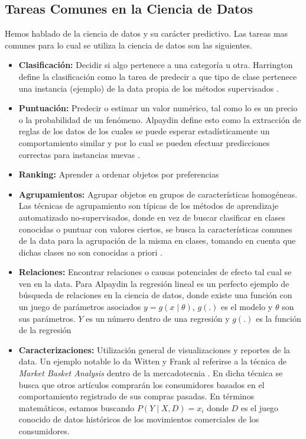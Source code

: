 \begin{spacing}{1.5}
\subsection{Tareas Comunes en la Ciencia de Datos}
Hemos hablado de la ciencia de datos y su carácter predictivo. Las tareas mas comunes para lo cual se utiliza la ciencia de datos son las siguientes.

\begin{itemize}
	\item \textbf{Clasificación:} Decidir si algo pertenece a una categoría u otra. Harrington define la clasificación como la tarea de predecir a que tipo de clase pertenece una instancia (ejemplo) de la data propia de los métodos supervisados \cite{harrington}.
	\item \textbf{Puntuación:} Predecir o estimar un valor numérico, tal como lo es un precio o la probabilidad de un fenómeno. Alpaydin define esto como la extracción de reglas de los datos de los cuales se puede esperar estadísticamente un comportamiento similar y por lo cual se pueden efectuar predicciones correctas para instancias nuevas \cite{alpaydin}.
	\item \textbf{Ranking:} Aprender a ordenar objetos por preferencias
	\item \textbf{Agrupamientos:} Agrupar objetos en grupos de características homogéneas. Las técnicas de agrupamiento son típicas de los métodos de aprendizaje automatizado no-supervisados, donde en vez de buscar clasificar en clases conocidas o puntuar con valores ciertos, se busca la características comunes de la data para la agrupación de la misma en clases, tomando en cuenta que dichas clases no son conocidas a priori \cite{harrington}. 
	\item \textbf{Relaciones:} Encontrar relaciones o causas potenciales de efecto tal cual se ven en la data. Para Alpaydin la regresión lineal es un perfecto ejemplo de búsqueda de relaciones en la ciencia de datos, donde existe una función con un juego de parámetros asociados $y = g(x \mid \theta)$, $g(.)$ es el modelo y $\theta$ son sus parámetros. $Y$ es un número dentro de una regresión y $g(.)$ es la función de la regresión \cite{alpaydin}
	\item \textbf{Caracterizaciones:} Utilización general de visualizaciones y reportes de la data. Un ejemplo notable lo da Witten y Frank al referirse a la técnica de \emph{Market Basket Analysis} dentro de la mercadotecnia \cite{datamining}. En dicha técnica se busca que otros artículos comprarán los consumidores basados en el comportamiento registrado de sus compras pasadas. En términos matemáticos, estamos buscando $P(Y \mid X,D) = x_i$ donde $D$ es el juego conocido de datos históricos de los movimientos comerciales de los consumidores. 
\end{itemize}


\end{spacing}
